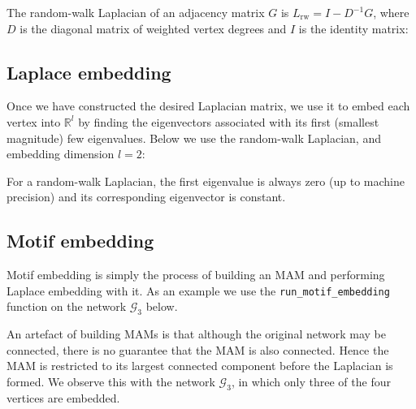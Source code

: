 \documentclass{article}
\begin{document}
The random-walk Laplacian of an adjacency matrix $G$ is
$L_\mathrm{rw} = I - D^{-1}G$,
where $D$ is the diagonal matrix of weighted vertex degrees
and $I$ is the identity matrix:

\begin{pyconsole}
\end{pyconsole}

\subsection{Laplace embedding}

Once we have constructed the desired Laplacian matrix,
we use it to embed each vertex into $\mathbb{R}^l$
by finding the eigenvectors associated with
its first (smallest magnitude) few eigenvalues.
Below we use the random-walk Laplacian,
and embedding dimension $l=2$:

\begin{pyconsole}
\end{pyconsole}

For a random-walk Laplacian,
the first eigenvalue is always zero (up to machine precision)
and its corresponding eigenvector is constant.

\subsection{Motif embedding}

Motif embedding is simply the process of building an MAM
and performing Laplace embedding with it.
As an example we use the
\texttt{run\_motif\_embedding}
function on the network $\mathcal{G}_3$ below.

\begin{pyconsole}
\end{pyconsole}

An artefact of building MAMs is that although the original network may
be connected, there is no guarantee that the MAM is also connected.
Hence the MAM is restricted to its largest connected component
before the Laplacian is formed.
We observe this with the network $\mathcal{G}_3$,
in which only three of the four vertices are embedded.

\begin{pyconsole}
\end{pyconsole}
\end{document}
